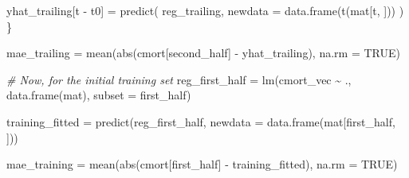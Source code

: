 \documentclass[
]{article}
\newenvironment{Shaded}{\begin{snugshade}}{\end{snugshade}}
\newcommand{\AttributeTok}[1]{\textcolor[rgb]{0.77,0.63,0.00}{#1}}
\newcommand{\CommentTok}[1]{\textcolor[rgb]{0.56,0.35,0.01}{\textit{#1}}}
\newcommand{\ConstantTok}[1]{\textcolor[rgb]{0.00,0.00,0.00}{#1}}
\newcommand{\FunctionTok}[1]{\textcolor[rgb]{0.00,0.00,0.00}{#1}}
\newcommand{\NormalTok}[1]{#1}
\newcommand{\OtherTok}[1]{\textcolor[rgb]{0.56,0.35,0.01}{#1}}
\newcommand{\SpecialCharTok}[1]{\textcolor[rgb]{0.00,0.00,0.00}{#1}}
\begin{document}
\begin{Shaded}
\begin{Highlighting}[]
\NormalTok{  yhat\_trailing[t }\SpecialCharTok{{-}}\NormalTok{ t0] }\OtherTok{=} \FunctionTok{predict}\NormalTok{(}
\NormalTok{    reg\_trailing,}
    \AttributeTok{newdata =} \FunctionTok{data.frame}\NormalTok{(}\FunctionTok{t}\NormalTok{(mat[t, ]))}
\NormalTok{  )}
\NormalTok{\}}

\NormalTok{mae\_trailing }\OtherTok{=} \FunctionTok{mean}\NormalTok{(}\FunctionTok{abs}\NormalTok{(cmort[second\_half] }\SpecialCharTok{{-}}\NormalTok{ yhat\_trailing), }\AttributeTok{na.rm =} \ConstantTok{TRUE}\NormalTok{)}

\CommentTok{\# Now, for the initial training set}
\NormalTok{reg\_first\_half }\OtherTok{=} \FunctionTok{lm}\NormalTok{(cmort\_vec }\SpecialCharTok{\textasciitilde{}}\NormalTok{ ., }\FunctionTok{data.frame}\NormalTok{(mat), }\AttributeTok{subset =}\NormalTok{ first\_half)}

\NormalTok{training\_fitted }\OtherTok{=} \FunctionTok{predict}\NormalTok{(reg\_first\_half, }\AttributeTok{newdata =} \FunctionTok{data.frame}\NormalTok{(mat[first\_half, ]))}

\NormalTok{mae\_training }\OtherTok{=} \FunctionTok{mean}\NormalTok{(}\FunctionTok{abs}\NormalTok{(cmort[first\_half] }\SpecialCharTok{{-}}\NormalTok{ training\_fitted), }\AttributeTok{na.rm =} \ConstantTok{TRUE}\NormalTok{)}


\end{Highlighting}
\end{Shaded}
\end{document}
